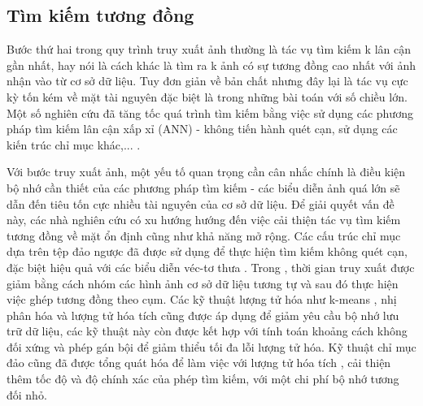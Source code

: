 \subsection{Tìm kiếm tương đồng}
Bước thứ hai trong quy trình truy xuất ảnh thường là tác vụ tìm kiếm k lân cận gần nhất, hay nói là cách khác là tìm ra k ảnh có sự tương đồng cao nhất với ảnh nhận vào từ cơ sở dữ liệu. Tuy đơn giản về bản chất nhưng đây lại là tác vụ cực kỳ tốn kém về mặt tài nguyên đặc biệt là trong những bài toán với số chiều lớn. Một số nghiên cứu đã tăng tốc quá trình tìm kiếm bằng việc sử dụng các phương pháp tìm kiếm lân cận xấp xỉ (ANN) - không tiến hành quét cạn, sử dụng các kiến trúc chỉ mục khác,... \cite{4270175, Xie2015ImageCA, Mikolajczyk2007ImprovingDF, Muja2009FastAN, Muja2012FastMO, wang2017survey, magliani2019efficient, johnson2017billionscale}. 

Với bước truy xuất ảnh, một yếu tố quan trọng cần cân nhắc chính là điều kiện bộ nhớ cần thiết của các phương pháp tìm kiếm - các biểu diễn ảnh quá lớn sẽ dẫn đến tiêu tốn cực nhiều tài nguyên của cơ sở dữ liệu. Để giải quyết vấn đề này, các nhà nghiên cứu có xu hướng hướng đến việc cải thiện tác vụ tìm kiếm tương đồng về mặt ổn định cũng như khả năng mở rộng. Các cấu trúc chỉ mục dựa trên tệp đảo ngược \cite{Salton1988TermWeightingAI} đã được sử dụng để thực hiện tìm kiếm không quét cạn, đặc biệt hiệu quả với các biểu diễn véc-tơ thưa \cite{Johns2011FromIT, Sivic2003VideoGA, imageSearchKernel, Mohedano2016BagsOL, noh2018largescale, Philbin2007ObjectRW}. Trong \cite{Johns2011FromIT}, thời gian truy xuất được giảm bằng cách nhóm các hình ảnh cơ sở dữ liệu tương tự và sau đó thực hiện việc ghép tương đồng theo cụm. Các kỹ thuật lượng tử hóa như k-means \cite{Philbin2007ObjectRW, Torii2013VisualPR}, nhị phân hóa \cite{Perronnin2010LargescaleIR} và lượng tử hóa tích \cite{imageSearchKernel} cũng được áp dụng để giảm yêu cầu bộ nhớ lưu trữ dữ liệu, các kỹ thuật này còn được kết hợp với tính toán khoảng cách không đối xứng \cite{5432202} và phép gán bội \cite{imageSearchKernel, Jgou2008HammingEA, 5432202, Philbin2007ObjectRW, Tolias2014VisualQE, Li2015PairwiseGM} để giảm thiểu tối đa lỗi lượng tử hóa. Kỹ thuật chỉ mục đảo cũng đã được tổng quát hóa để làm việc với lượng tử hóa tích \cite{Guo2016DeepLF, 5432202, Babenko2012TheIM}, cải thiện thêm tốc độ và độ chính xác của phép tìm kiếm, với một chi phí bộ nhớ tương đối nhỏ.